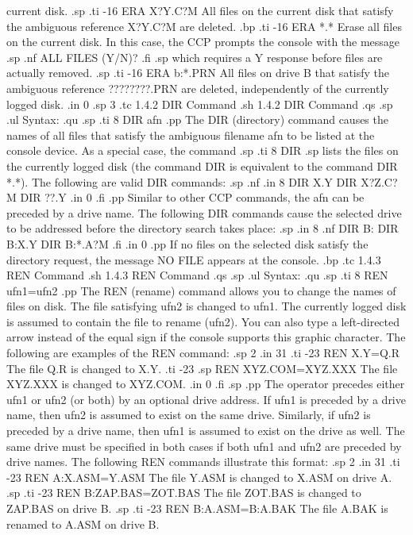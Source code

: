 current disk.
.sp
.ti -16
ERA X?Y.C?M     All files on the current disk that satisfy the ambiguous
reference X?Y.C?M are deleted.
.bp
.ti -16
ERA *.*         Erase all files on the current disk.  In this 
case, the CCP prompts the console with the message
.sp
.nf
ALL FILES (Y/N)?
.fi
.sp
which requires a Y response before files are actually removed.
.sp
.ti -16
ERA b:*.PRN     All files on drive B that satisfy the ambiguous
reference ????????.PRN are deleted, independently of the currently
logged disk.
.in 0
.sp 3
.tc         1.4.2  DIR Command
.sh
1.4.2  DIR Command
.qs
.sp
.ul
Syntax:
.qu
.sp
.ti 8
DIR afn
.pp
The DIR (directory) command causes the names of all files that satisfy the
ambiguous filename afn to be listed at the console device.  As a special
case, the command
.sp
.ti 8
DIR
.sp
lists the files on the currently logged disk (the command DIR is
equivalent to the command DIR *.*).  The following are valid DIR 
commands:
.sp
.nf
.in 8
DIR X.Y
DIR X?Z.C?M
DIR ??.Y
.in 0
.fi
.pp
Similar to other CCP commands, the afn can be preceded by a drive name.
The following DIR commands cause the selected drive to be addressed before
the directory search takes place:
.sp
.in 8
.nf
DIR B:
DIR B:X.Y
DIR B:*.A?M
.fi
.in 0
.pp
If no files on the selected disk satisfy the directory request, the
message NO FILE appears at the console.
.bp
.tc         1.4.3  REN Command
.sh
1.4.3  REN Command
.qs
.sp
.ul
Syntax:
.qu
.sp
.ti 8
REN ufn1=ufn2
.pp
The REN (rename) command allows you to change the names of files on
disk.  The file satisfying ufn2 is changed to ufn1.  The currently logged
disk is assumed to contain the file to rename (ufn2).  You can also
type a left-directed arrow instead of the equal sign if the console supports
this graphic character.  The following are examples of the REN 
command:
.sp 2
.in 31
.ti -23
REN X.Y=Q.R            The file Q.R is changed to X.Y.
.ti -23
.sp
REN XYZ.COM=XYZ.XXX    The file XYZ.XXX is changed to XYZ.COM.
.in 0
.fi
.sp
.pp
The operator precedes either ufn1 or ufn2 (or both) by an optional drive
address.  If ufn1 is preceded by a drive name, then ufn2 is assumed to exist
on the same drive.  Similarly, if ufn2 is preceded by a drive name, then
ufn1 is assumed to exist on the drive as well.  The same drive must be
specified in both cases if both ufn1 and ufn2 are preceded by drive names.
The following REN commands illustrate this format:
.sp 2
.in 31
.ti -23
REN A:X.ASM=Y.ASM      The file Y.ASM is changed to X.ASM on drive A.
.sp
.ti -23
REN B:ZAP.BAS=ZOT.BAS  The file ZOT.BAS is changed to ZAP.BAS on drive B.
.sp
.ti -23
REN B:A.ASM=B:A.BAK    The file A.BAK is renamed to A.ASM on drive B.
